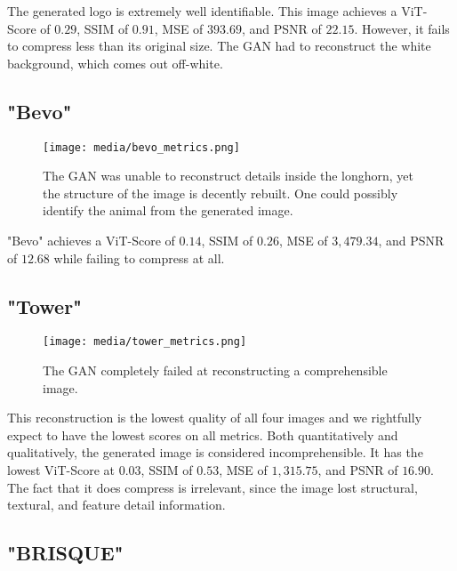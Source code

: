 The generated logo is extremely well identifiable.
This image achieves a ViT-Score of $0.29$, SSIM of $0.91$, MSE of $393.69$, and PSNR of $22.15$. However, it fails to compress
less than its original size. The GAN had to reconstruct the white background, which comes out off-white.

\subsection{"Bevo"}

\begin{figure}[H]
        \begin{center}
        \texttt{[image: media/bevo\_metrics.png]}
        \end{center}
        \caption["Bevo" Established Metrics]{The GAN was unable to reconstruct details inside the longhorn, yet
        the structure of the image is decently rebuilt. One could possibly identify the animal from the generated image.}
        \end{figure}

"Bevo" achieves a ViT-Score of $0.14$, SSIM of $0.26$, MSE of $3,479.34$, and PSNR of $12.68$ while failing to compress at all. 

\subsection{"Tower"}

\begin{figure}[H]
        \begin{center}
        \texttt{[image: media/tower\_metrics.png]}
        \end{center}
        \caption["Tower" Established Metrics]{The GAN completely failed at reconstructing a comprehensible image.}
        \end{figure}

This reconstruction is the lowest quality of all four images and we rightfully expect to have the lowest scores on all metrics.
Both quantitatively and qualitatively, the generated image is considered incomprehensible. 
It has the lowest ViT-Score at $0.03$, SSIM of $0.53$, MSE of $1,315.75$, and PSNR of $16.90$. The fact that it does compress is 
irrelevant, since the image lost structural, textural, and feature detail information.

\subsection{"BRISQUE"}

